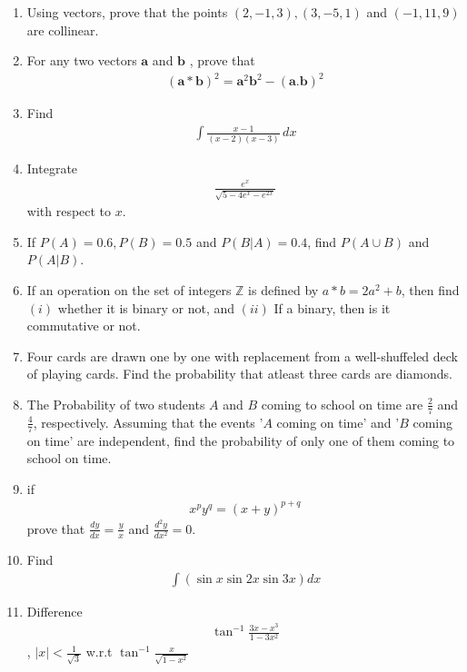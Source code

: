 \documentclass[12pt,-letter paper]{article}
\let\vec\mathbf{}
\let\vec\mathbf{}
\let\vec\mathbf{}
\begin{document}
\begin{enumerate}
\item Using vectors, prove that the points $(2,-1,3), (3,-5,1)$ and $(-1,11,9)$ are collinear.

\item For any two vectors $\vec{a}$ and $\vec{b}$ , prove that \begin{align*}(\vec{a}*\vec{b})^2=\vec{a}^2\vec{b}^2-(\vec{a}.\vec{b})^2\end{align*}

\item Find \begin{align*}\int \frac{x-1}{(x-2)(x-3)}\,dx\end{align*}

	\item Integrate \begin{align*}\frac{e^x}{\sqrt{5-4e^x-e^{2x}}}\end{align*} with respect to $x$.

\item If $P(A)=0.6, P(B)=0.5$ and $P(B|A)=0.4$, find $P(A \cup B)$ and $P(A|B)$. 

\item If an operation on the set of integers $\mathbb{Z}$ is defined by $a*b=2a^2+b$, then find $(i)$ whether it is binary or not,  and $(ii)$ If a binary, then is it commutative or not.


\item Four cards are drawn one by one with replacement from a well-shuffeled deck of playing cards. Find the probability that atleast three cards are diamonds.

\item The Probability of two students $A$ and $B$ coming to school on time are $\frac{2}{7}$ and $\frac{4}{7}$, respectively. Assuming that the events '$A$ coming on time' and '$B$ coming on time' are independent, find the probability of only one of them coming to school on time.

\item if \begin{align*}x^py^q=(x+y)^{p+q}\end{align*} prove that $\frac{dy}{dx}=\frac{y}{x}$ and $\frac{d^2y}{dx^2}=0$.
		
\item Find \begin{align*}\int (\sin x \sin 2x \sin 3x) dx\end{align*}

\item Difference \begin{align*}\tan^{-1}\frac{3x-x^3}{1-3x^2}\end{align*}, $|x|<\frac{1}{\sqrt{3}}$ w.r.t $\tan^{-1}\frac{x}{\sqrt{1-x^2}}$


\end{enumerate}
\end{document}
